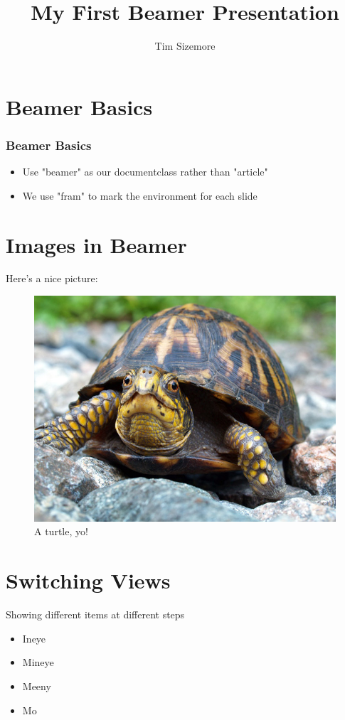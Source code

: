 \documentclass{beamer}
\begin{document}
\title{My First Beamer Presentation}
\author{Tim Sizemore}

\begin{frame}
\maketitle
\end{frame}

\begin{frame}
\tableofcontents
\end{frame}

\section{Beamer Basics}
\begin{frame}
\frametitle{Beamer Basics}
\begin{itemize}
\item Use "beamer" as our documentclass rather than "article"
\item We use "fram" to mark the environment for each slide
\end{itemize}
\end{frame}

\section{Images in Beamer}
\begin{frame}
Here's a nice picture:
\begin{figure}[h!]
\begin{center}
\includegraphics[width=.75\textwidth]{eastern-box-turtle.jpg}
\caption{A turtle, yo!}
\end{center}
\end{figure}
\end{frame}

\section{Switching Views}
\begin{frame}
Showing different items at different steps
\begin{itemize}
\item<1 - > Ineye
\item<2 - > Mineye
\item<3>    Meeny
\item<4>    Mo
\end{itemize}
\end{frame}
\end{document}
